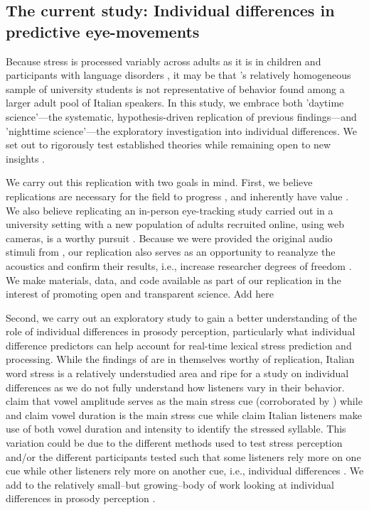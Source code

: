 \subsection{The current study: Individual differences in predictive eye-movements}
Because stress is processed variably across adults as it is in children \citep[e.g.,][]{Colombo2014} and participants with language disorders \citep[e.g.,][]{Cappa1997, Liu2018}, it may be that \cite{Sulpizio_McQueen_2012}'s relatively homogeneous sample of university students is not representative of behavior found among a larger adult pool of Italian speakers. In this study, we embrace both 'daytime science'—the systematic, hypothesis-driven replication of previous findings—and 'nighttime science'—the exploratory investigation into individual differences. We set out to rigorously test established theories while remaining open to new insights \citep{Yanai2020}.

We carry out this replication with two goals in mind. First, we believe replications are necessary for the field to progress \citep{Rakosi2017}, and inherently have value \citep{Kobrock2023}. We also believe replicating an in-person eye-tracking study carried out in a university setting with a new population of adults recruited online, using web cameras, is a worthy pursuit \citep{Prystauka_Altmann_Rothman_2023}. Because we were provided the original audio stimuli from \cite{Sulpizio_McQueen_2012}, our replication also serves as an opportunity to reanalyze the acoustics and confirm their results, i.e., increase researcher degrees of freedom \cite{Corretta2023}. We make materials, data, and code available as part of our replication in the interest of promoting open and transparent science.    Add here




Second, we carry out an exploratory study to gain a better understanding of the role of individual differences in prosody perception, particularly what individual difference predictors can help account for real-time lexical stress prediction and processing. While the findings of \cite{Sulpizio_McQueen_2012} are in themselves worthy of replication, Italian word stress is a relatively understudied area and ripe for a study on individual differences as we do not fully understand how listeners vary in their behavior. \cite{Maturi1998} claim that vowel amplitude serves as the main stress cue (corroborated by \cite{Sulpizio_McQueen_2012}) while \cite{Alfano2006} and \cite{Alfano2009} claim vowel duration is the main stress cue while \cite{Tagliapietra2005} claim Italian listeners make use of both vowel duration and intensity to identify the stressed syllable. This variation could be due to the different methods used to test stress perception and/or the different participants tested such that some listeners rely more on one cue while other listeners rely more on another cue, i.e., individual differences  \citep{Yu2019, Kidd2018}. We add to the relatively small--but growing--body of work looking at individual differences in prosody perception \citep[e.g.,][]{Roy2017, Bishop2017, Lameris2023, Sinagra2022}.

